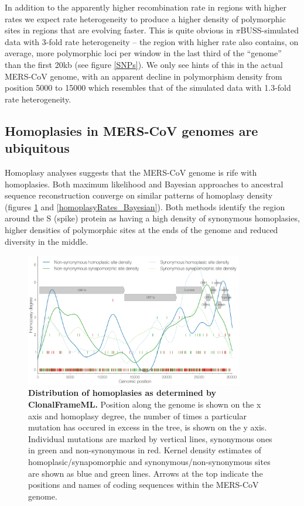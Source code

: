 \documentclass[11pt,oneside,letterpaper]{article}
\begin{document}
In addition to the apparently higher recombination rate in regions with higher rates we expect rate heterogeneity to produce a higher density of polymorphic sites in regions that are evolving faster.
This is quite obvious in $\pi$BUSS-simulated data with 3-fold rate heterogeneity -- the region with higher rate also contains, on average, more polymorphic loci per window in the last third of the ``genome'' than the first 20kb (see figure \ref{SNPs}).
We only see hints of this in the actual MERS-CoV genome, with an apparent decline in polymorphism density from position 5000 to 15000 which resembles that of the simulated data with 1.3-fold rate heterogeneity.

\subsection*{Homoplasies in MERS-CoV genomes are ubiquitous}
Homoplasy analyses suggests that the MERS-CoV genome is rife with homoplasies.
Both maximum likelihood and Bayesian approaches to ancestral sequence reconstruction converge on similar patterns of homoplasy density (figures \ref{homoplasy_densities} and \ref{homoplasyRates_Bayesian}).
Both methods identify the region around the S (spike) protein as having a high density of synonymous homoplasies, higher densities of polymorphic sites at the ends of the genome and reduced diversity in the middle.

\begin{figure}[h]
	\centering
	\includegraphics[width=0.85\textwidth]{figures/MERS_ML_homoplasyRate.png}
	\caption{\textbf{Distribution of homoplasies as determined by ClonalFrameML.}
Position along the genome is shown on the x axis and homoplasy degree, the number of times a particular mutation has occured in excess in the tree, is shown on the y axis.
Individual mutations are marked by vertical lines, synonymous ones in green and non-synonymous in red.
Kernel density estimates of homoplasic/synapomorphic and synonymous/non-synonymous sites are shown as blue and green lines.
Arrows at the top indicate the positions and names of coding sequences within the MERS-CoV genome.}
	\label{homoplasy_densities}
\end{figure}
\end{document}
